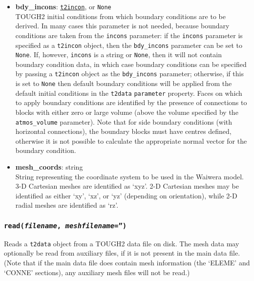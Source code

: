 \begin{itemize}
\item \textbf{bdy\_incons}: \hyperref[incons]{\texttt{t2incon}}, or \texttt{None}\\
  TOUGH2 initial conditions from which boundary conditions are to be derived. In many cases this parameter is not needed, because boundary conditions are taken from the \texttt{incons} parameter: if the \texttt{incons} parameter is specified as a \texttt{t2incon} object, then the \texttt{bdy\_incons} parameter can be set to \texttt{None}. If, however, \texttt{incons} is a string or \texttt{None}, then it will not contain boundary condition data, in which case boundary conditions can be specified by passing a \texttt{t2incon} object as the \texttt{bdy\_incons} parameter; otherwise, if this is set to \texttt{None} then default boundary conditions will be applied from the default initial conditions in the \texttt{t2data} \texttt{parameter} property. Faces on which to apply boundary conditions are identified by the presence of connections to blocks with either zero or large volume (above the volume specified by the \texttt{atmos\_volume} parameter). Note that for side boundary conditions (with horizontal connections), the boundary blocks must have centres defined, otherwise it is not possible to calculate the appropriate normal vector for the boundary condition.
\item \textbf{mesh\_coords}: string\\
  String representing the coordinate system to be used in the Waiwera model. 3-D Cartesian meshes are identified as `xyz'. 2-D Cartesian meshes may be identified as either `xy', `xz', or `yz' (depending on orientation), while 2-D radial meshes are identified as `rz'.
\end{itemize}

\begin{snugshade}
\subsubsection{\texttt{read(\emph{filename}, \emph{meshfilename}='')}}
\end{snugshade}
\label{sec:t2data:read}

Reads a \texttt{t2data} object from a TOUGH2 data file on disk.  The mesh data may optionally be read from auxiliary files, if it is not present in the main data file.  (Note that if the main data file does contain mesh information (the `ELEME' and `CONNE' sections), any auxiliary mesh files will not be read.)

